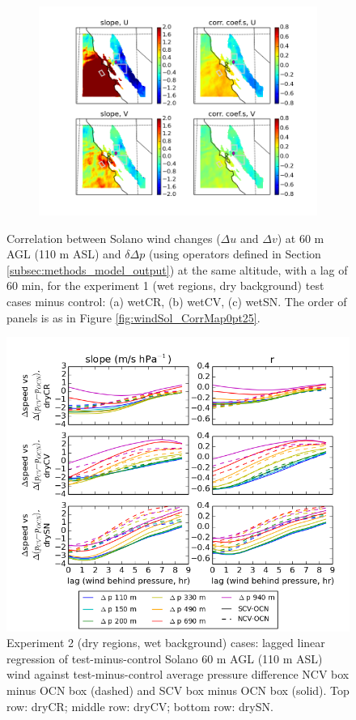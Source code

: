 \begin{figure}[here]
\begin{subfigure}{0.5\textwidth}
\includegraphics[width=\textwidth]{ch3-wind/img/corr_dwind_dpanom_lev110_lag2_wetSN.png}
\caption{}
\end{subfigure}
\caption{Correlation between Solano wind changes ($\Delta u$ and $\Delta v$) at 60 m AGL (110 m ASL) and $\delta \Delta p$ (using operators defined in Section \ref{subsec:methods_model_output}) at the same altitude, with a lag of 60 min, for the experiment 1 (wet regions, dry background) test cases minus control: (a) wetCR, (b) wetCV, (c) wetSN.  The order of panels is as in Figure \ref{fig:windSol_CorrMap0pt25}.}
\label{fig:windSol_CorrMapWetRg}
\end{figure}

\begin{figure}[here]
\includegraphics[width=1\textwidth]{ch3-wind/img/lag_corr_dpdiff_combo_ncv_scv_d02_testminusctrl.png}
\caption{Experiment 2 (dry regions, wet background) cases: lagged linear regression of test-minus-control Solano 60 m AGL (110 m ASL) wind against test-minus-control average pressure difference NCV box minus OCN box (dashed) and SCV box minus OCN box (solid).  Top row: dryCR; middle row: dryCV; bottom row: drySN.}
\label{fig:windSol_LagCorrTest}
\end{figure}


